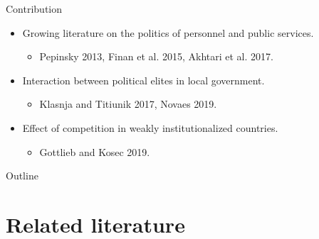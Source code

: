 \documentclass[ignorenonframetext,]{beamer}
\providecommand{\tightlist}{%
  \setlength{\itemsep}{0pt}\setlength{\parskip}{0pt}}
\newcommand{\source}{\footnotesize\textcolor{black!25}}
\begin{document}
\begin{frame}{Contribution}
\protect\hypertarget{contribution}{}

\begin{itemize}
\tightlist
\item
  Growing literature on the politics of personnel and public services.

  \begin{itemize}
  \item
    \source{Pepinsky 2013, Finan et al. 2015, Akhtari et al. 2017.}
  \end{itemize}
\item
  Interaction between political elites in local government.

  \begin{itemize}
  \item
    \source{Klasnja and Titiunik 2017, Novaes 2019.}
  \end{itemize}
\item
  Effect of competition in weakly institutionalized countries.

  \begin{itemize}
  \item
    \source{Gottlieb and Kosec 2019.}
  \end{itemize}
\end{itemize}

\end{frame}

\begin{frame}{Outline}
\protect\hypertarget{outline}{}

\singlespacing

\tableofcontents

\end{frame}

\hypertarget{related-literature}{%
\section{Related literature}\label{related-literature}}
\end{document}
